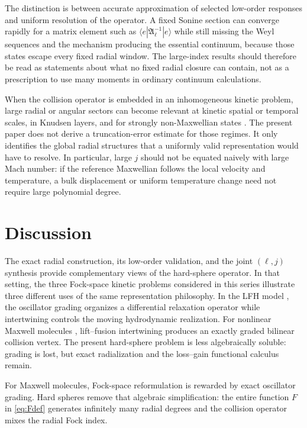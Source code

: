 \documentclass[11pt]{article}
\numberwithin{equation}{section}
\theoremstyle{definition}
\begin{document}
The distinction is between accurate approximation of selected low-order
responses and uniform resolution of the operator.  A fixed Sonine section can
converge rapidly for a matrix element such as
$\langle e|\mathfrak A_\ell^{-1}|e\rangle$ while still missing the Weyl
sequences and the mechanism producing the essential continuum, because those
states escape every fixed radial window.  The large-index results should
therefore be read as statements about what no fixed radial closure can contain,
not as a prescription to use many moments in ordinary continuum calculations.

When the collision operator is embedded in an inhomogeneous kinetic problem,
large radial or angular sectors can become relevant at kinetic spatial or
temporal scales, in Knudsen layers, and for strongly non-Maxwellian states
\cite{GradRarefied1949,ChapmanCowling1970}.  The present paper does not derive a
truncation-error estimate for those regimes.  It only identifies the global
radial structures that a uniformly valid representation would have to resolve.
In particular, large $j$ should not be equated naively with large Mach number:
if the reference Maxwellian follows the local velocity and temperature, a bulk
displacement or uniform temperature change need not require large polynomial
degree.

\section{Discussion}
\label{sec:discussion}

The exact radial construction, its low-order validation, and the joint
$(\ell,j)$ synthesis provide complementary views of the hard-sphere operator.  In that setting, the three Fock-space kinetic problems considered
in this series illustrate three different uses of the same representation
philosophy.  In the LFH model
\cite{KarlinLFH2026}, the oscillator grading organizes a differential
relaxation operator while intertwining controls the moving hydrodynamic
realization.  For nonlinear Maxwell molecules \cite{KarlinMaxwell2026},
lift--fusion intertwining produces an exactly graded bilinear collision
vertex.  The present hard-sphere problem is less algebraically soluble:
grading is lost, but exact radialization and the loss--gain functional
calculus remain.

For Maxwell molecules, Fock-space reformulation is rewarded by exact
oscillator grading.  Hard spheres remove that algebraic simplification:
the entire function $F$ in \eqref{eq:Fdef} generates infinitely many radial
degrees and the collision operator mixes the radial Fock index.
\end{document}
